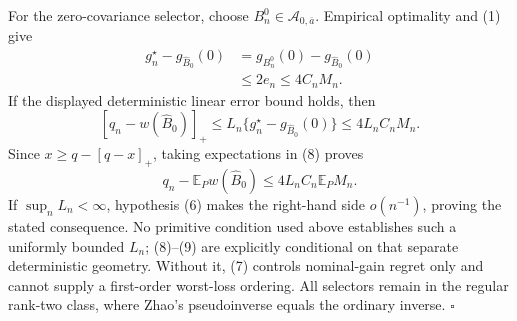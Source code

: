 For the zero-covariance selector, choose \(B_n^0\in\mathcal A_{0,\overline a}\).  Empirical optimality and (1) give
\[
\begin{aligned}
g_n^\star-g_{\widehat B_0}(0)
&=g_{B_n^0}(0)-g_{\widehat B_0}(0)\\
&\le2e_n
\le4C_nM_n.
\end{aligned}
\tag{7}
\]
If the displayed deterministic linear error bound holds, then
\[
[q_n-w(\widehat B_0)]_+
\le L_n\{g_n^\star-g_{\widehat B_0}(0)\}
\le4L_nC_nM_n.
\tag{8}
\]
Since \(x\ge q-[q-x]_+\), taking expectations in (8) proves
\[
q_n-\mathbb E_Pw(\widehat B_0)
\le4L_nC_n\mathbb E_PM_n.
\tag{9}
\]
If \(\sup_nL_n<\infty\), hypothesis (6) makes the right-hand side \(o(n^{-1})\), proving the stated consequence.  No primitive condition used above establishes such a uniformly bounded \(L_n\); (8)--(9) are explicitly conditional on that separate deterministic geometry.  Without it, (7) controls nominal-gain regret only and cannot supply a first-order worst-loss ordering.  All selectors remain in the regular rank-two class, where Zhao's pseudoinverse equals the ordinary inverse. \(\square\)